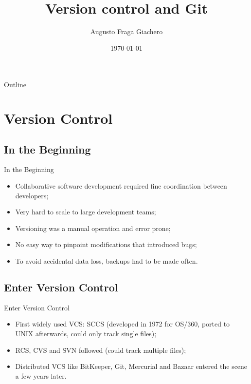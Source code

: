 \documentclass{beamer}
\title{Version control and Git}
\author{Augusto Fraga Giachero}
\date{\today}
\begin{document}
\begin{frame}
  \titlepage 
\end{frame}

\begin{frame}{Outline}
  \tableofcontents
\end{frame}

\section{Version Control}

\subsection{In the Beginning}
\begin{frame}{In the Beginning}
  \begin{itemize}
    \item Collaborative software development required fine coordination between developers;
    \item Very hard to scale to large development teams;
    \item Versioning was a manual operation and error prone;
    \item No easy way to pinpoint modifications that introduced bugs;
    \item To avoid accidental data loss, backups had to be made often.
  \end{itemize}
\end{frame}

\subsection{Enter Version Control}
\begin{frame}{Enter Version Control}
  \begin{itemize}
    \item First widely used VCS: SCCS (developed in 1972 for OS/360, ported to UNIX afterwards, could only track single files);
    \item RCS, CVS and SVN followed (could track multiple files);
    \item Distributed VCS like BitKeeper, Git, Mercurial and Bazaar entered the scene a few years later.
  \end{itemize}
\end{frame}
\end{document}

